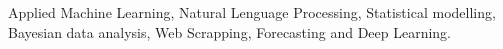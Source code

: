 


\begin{cvparagraph}
Applied Machine Learning, Natural Lenguage Processing, Statistical modelling, Bayesian data analysis, Web Scrapping, Forecasting and Deep Learning.

\end{cvparagraph}